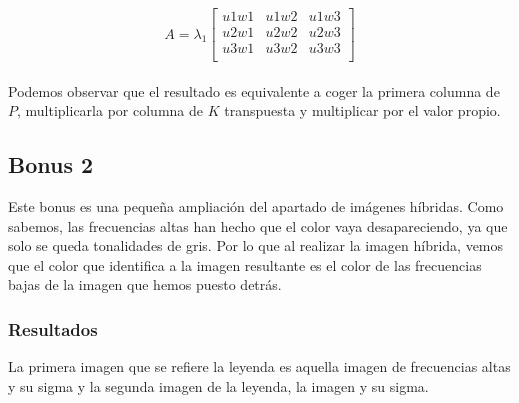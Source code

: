 \documentclass{article}
\begin{document}
\[
A=
\lambda_1\begin{bmatrix}
u1w1 & u1w2 & u1w3 \\
u2w1 & u2w2 & u2w3 \\
u3w1 & u3w2 & u3w3  \\
\end{bmatrix}
\]\\
Podemos observar que el resultado es equivalente a coger la primera columna de $P$, multiplicarla por columna de $K$ transpuesta y multiplicar por el valor propio.

\subsection{Bonus 2}
Este bonus es una pequeña ampliación del apartado de imágenes híbridas. Como sabemos, las frecuencias altas han hecho que el color vaya desapareciendo, ya que solo se queda tonalidades de gris. Por lo que al realizar la imagen híbrida, vemos que el color que identifica a la imagen resultante es el color de las frecuencias bajas de la imagen que hemos puesto detrás.

\subsubsection{Resultados}
La primera imagen que se refiere la leyenda es aquella imagen de frecuencias altas y su sigma y la segunda imagen de la leyenda, la imagen y su sigma.
\end{document}
